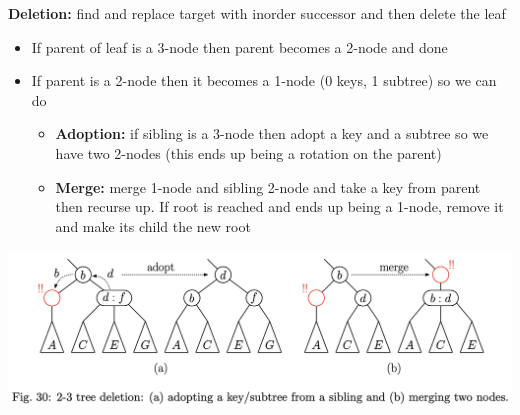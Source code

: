 \documentclass{article}
\begin{document}
  \newpage
  \textbf{Deletion: }find and replace target with inorder successor and then delete the leaf
  \begin{itemize}[noitemsep]
  \item If parent of leaf is a 3-node then parent becomes a 2-node and done
  \item If parent is a 2-node then it becomes a 1-node (0 keys, 1 subtree) so we can do
    \begin{itemize}[noitemsep]
      \item \textbf{Adoption: }if sibling is a 3-node then adopt a key and a subtree so we have two 2-nodes (this ends up being a rotation on the parent)
      \item \textbf{Merge: }merge 1-node and sibling 2-node and take a key from parent then recurse up. If root is reached and ends up being a 1-node, remove it and make its child the new root
    \end{itemize}
  \end{itemize}
  \begin{center}
    \includegraphics[scale=0.5]{2-3TreeAdoptAndMerge}
  \end{center}
\end{document}
